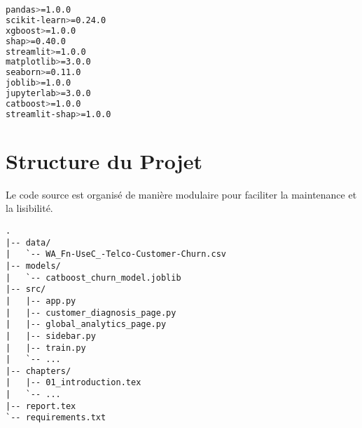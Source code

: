 \begin{lstlisting}[language=bash, caption={Contenu du fichier requirements.txt}]
pandas>=1.0.0
scikit-learn>=0.24.0
xgboost>=1.0.0
shap>=0.40.0
streamlit>=1.0.0
matplotlib>=3.0.0
seaborn>=0.11.0
joblib>=1.0.0
jupyterlab>=3.0.0
catboost>=1.0.0
streamlit-shap>=1.0.0
\end{lstlisting}

\section{Structure du Projet}
Le code source est organisé de manière modulaire pour faciliter la maintenance et la lisibilité.
\begin{verbatim}
.
|-- data/
|   `-- WA_Fn-UseC_-Telco-Customer-Churn.csv
|-- models/
|   `-- catboost_churn_model.joblib
|-- src/
|   |-- app.py
|   |-- customer_diagnosis_page.py
|   |-- global_analytics_page.py
|   |-- sidebar.py
|   |-- train.py
|   `-- ...
|-- chapters/
|   |-- 01_introduction.tex
|   `-- ...
|-- report.tex
`-- requirements.txt
\end{verbatim}

